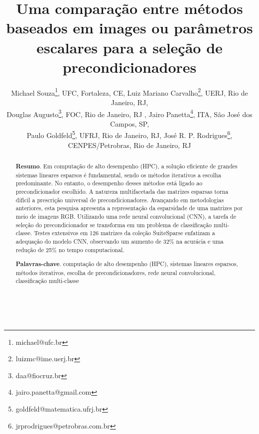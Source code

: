 \documentclass{pssbmac}
\begin{document}
{}{\

\title{Uma comparação entre métodos baseados em images ou parâmetros escalares para a seleção de precondicionadores}

\author{
    {\large Michael Souza}\thanks{michael@ufc.br}, {\small UFC, Fortaleza, CE},  {\large Luiz Mariano Carvalho}\thanks{luizmc@ime.uerj.br}, {\small  UERJ, Rio de Janeiro, RJ}, \\
    {\large Douglas Augusto}\thanks{daa@fiocruz.br}, {\small FOC, Rio de Janeiro, RJ }, {\large Jairo Panetta}\thanks{jairo.panetta@gmail.com}, {\small ITA, São José dos Campos, SP}, \\
    {\large Paulo Goldfeld}\thanks{goldfeld@matematica.ufrj.br}, {\small UFRJ, Rio de Janeiro, RJ}, {\large José R. P. Rodrigues}\thanks{jrprodrigues@petrobras.com.br}, {\small CENPES/Petrobras, Rio de Janeiro, RJ} \\
}
}
\criartitulo



\begin{abstract}
{\bf Resumo}. Em computação de alto desempenho (HPC), a solução eficiente de grandes sistemas lineares esparsos é fundamental, 
sendo os métodos iterativos a escolha predominante. No entanto, o desempenho desses métodos está ligado ao precondicionador
 escolhido. A natureza multifacetada das matrizes esparsas
torna difícil a prescrição universal de precondicionadores. Avançando em metodologias anteriores, esta pesquisa apresenta a representação da esparsidade de uma matrizes
 por meio de imagens RGB. Utilizando uma rede neural convolucional
(CNN), a tarefa de seleção do precondicionador se transforma em um problema de classificação
multi-classe. Testes extensivos em 126 matrizes da coleção SuiteSparse enfatizam a
adequação do modelo CNN, observando um aumento de 32\% na acurácia e uma redução de 25\%
no tempo computacional.

\noindent
{\bf Palavras-chave}. computação de alto desempenho (HPC), sistemas lineares esparsos,  métodos iterativos, escolha de precondicionadores,
 rede neural convolucional, classificação multi-classe
\end{abstract}
\end{document}
